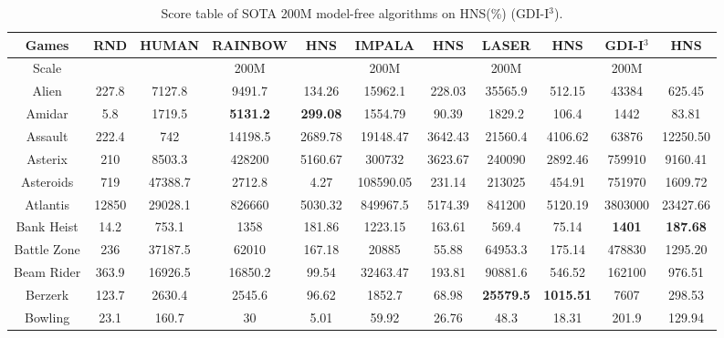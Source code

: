\documentclass[nohyperref]{article}
\newcommand{\best}[1]{\textbf{#1}}
\theoremstyle{plain}
\begin{document}
\begin{table}[!hb]
\footnotesize
\begin{center}
\caption{Score table of SOTA 200M model-free algorithms on HNS(\%) (GDI-I$^3$).}
\setlength{\tabcolsep}{1.0pt}
\begin{tabular}{ |c| c| c| c c| c c| c c| c c| }
\hline
Games & RND & HUMAN & RAINBOW & HNS & IMPALA & HNS & LASER & HNS & GDI-I$^3$ & HNS \\
\hline
Scale  &     &       & 200M   &       &  200M    &        & 200M   &         &  200M   &  \\
\hline
 Alien  & 227.8 & 7127.8            & 9491.7 & 134.26 & 15962.1  & 228.03 & 35565.9 & 512.15                        &43384             &625.45             \\
 Amidar & 5.8   & 1719.5            & \textbf{5131.2} & \textbf{299.08} & 1554.79  & 90.39  & 1829.2  & 106.4       &1442              &83.81                \\
 Assault & 222.4 & 742              & 14198.5 & 2689.78 & 19148.47 & 3642.43  & 21560.4 & 4106.62                   &63876             &12250.50          \\
 Asterix & 210   & 8503.3           & 428200 & 5160.67 & 300732   & 3623.67  & 240090  & 2892.46                    &759910            &9160.41            \\
 Asteroids & 719 & 47388.7          & 2712.8 & 4.27   & 108590.05 & 231.14  & 213025  &  454.91                     &751970            &1609.72          \\
 Atlantis & 12850 & 29028.1         & 826660 & 5030.32 & 849967.5 & 5174.39 & 841200 & 5120.19                      &3803000           &23427.66          \\
 Bank Heist & 14.2 & 753.1          & 1358   & 181.86  & 1223.15  & 163.61  & 569.4  & 75.14                        &\best{1401}       &\best{187.68}       \\
 Battle Zone & 236 & 37187.5        & 62010 & 167.18  & 20885    & 55.88  & 64953.3 & 175.14                        &478830            &1295.20            \\
 Beam Rider & 363.9 & 16926.5       & 16850.2 & 99.54 & 32463.47 & 193.81 & 90881.6 & 546.52                        &162100            &976.51             \\
 Berzerk & 123.7 & 2630.4           & 2545.6   & 96.62  & 1852.7   & 68.98  & \textbf{25579.5} & \textbf{1015.51}   &7607              &298.53              \\
 Bowling & 23.1 & 160.7             & 30   & 5.01        & 59.92    & 26.76  & 48.3    & 18.31                      &201.9             &129.94              \\

\end{tabular}
\end{center}
\end{table}
\end{document}

